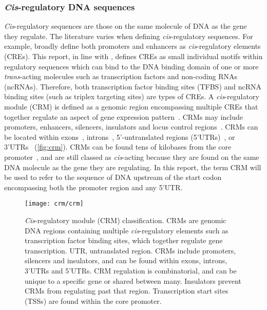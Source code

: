 \documentclass[../main.tex]{subfiles}
\begin{document}
\subsubsection{\texorpdfstring{\textit{Cis}-regulatory DNA sequences}{Cis\hyp{}regulatory DNA sequences}}\label{chapter1:cis-regulatory-dna-sequences}
\textit{Cis}\hyp{}regulatory sequences are those on the same molecule of DNA as the gene they regulate. The literature varies when defining \textit{cis}\hyp{}regulatory sequences. For example, \textcite*{wittkoppCisregulatoryElementsMolecular2012} broadly define both promoters and enhancers as \textit{cis}\hyp{}regulatory elements (CREs). This report, in line with \textcite*{swinnenLessonsDomesticationTargeting2016}, defines CREs as small individual motifs within regulatory sequences which can bind to the DNA binding domain of one or more \textit{trans}\hyp{}acting molecules such as transcription factors and non\hyp{}coding RNAs (ncRNAs). Therefore, both transcription factor binding sites (TFBS) and ncRNA binding sites (such as triplex targeting sites) are types of CREs.
A \textit{cis}\hyp{}regulatory module (CRM) is defined as a genomic region encompassing multiple CREs that together regulate an aspect of gene expression pattern~\autocite{guoNewAlgorithmIdentifying2017}. CRMs may include promoters, enhancers, silencers, insulators and locus control regions~\autocite{jeziorskaSystemsBiologyApproach2009}. CRMs can be located within exons~\autocite{tumpelRegulatoryModuleEmbedded2008}, introns~\autocite{ostrovskyIdentificationStrongIntron2018}, 5’\hyp{}untranslated regions (5’UTRs)~\autocite{bolleSegmentsEncodingUntranslated1994,henrySharedCisregulatoryModule2018}, or 3’UTRs~\autocite{palmerEnhancerControlsSnail2007,yochumGenomewideScreenBetacatenin2008} (\autoref{fig:crm}). CRMs can be found tens of kilobases from the core promoter~\autocite{bien-willnerSOX9cre1CisactingRegulatory2007,okaGenomewideMappingTranscriptional2017}, and are still classed as \textit{cis}\hyp{}acting because they are found on the same DNA molecule as the gene they are regulating. In this report, the term CRM will be used to refer to the sequence of DNA upstream of the start codon encompassing both the promoter region and any 5’UTR.

\begin{figure}[!ht]
\begin{center}
\capstart
\texttt{[image: crm/crm]}
\caption{\textit{Cis}\hyp{}regulatory module (CRM) classification. CRMs are genomic DNA
regions containing multiple \textit{cis}\hyp{}regulatory elements such as
transcription factor binding sites, which together regulate gene
transcription. UTR, untranslated region. CRMs include promoters,
silencers and insulators, and can be found within exons, introns, 3'UTRs
and 5'UTRs. CRM regulation is combinatorial, and can be unique to a
specific gene or shared between many. Insulators prevent CRMs from
regulating past that region. Transcription start sites (TSSs) are found
within the core promoter.
\label{fig:crm}
}
\end{center}
\end{figure}
\end{document}
